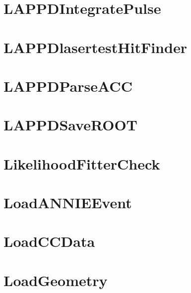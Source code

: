 \documentclass[twoside]{book}
\begin{document}
\chapter{L\-A\-P\-P\-D\-Integrate\-Pulse}
\label{md_UserTools_LAPPDIntegratePulse_README}
\hypertarget{md_UserTools_LAPPDIntegratePulse_README}{}

\chapter{L\-A\-P\-P\-Dlasertest\-Hit\-Finder}
\label{md_UserTools_LAPPDlasertestHitFinder_README}
\hypertarget{md_UserTools_LAPPDlasertestHitFinder_README}{}

\chapter{L\-A\-P\-P\-D\-Parse\-A\-C\-C}
\label{md_UserTools_LAPPDParseACC_README}
\hypertarget{md_UserTools_LAPPDParseACC_README}{}

\chapter{L\-A\-P\-P\-D\-Save\-R\-O\-O\-T}
\label{md_UserTools_LAPPDSaveROOT_README}
\hypertarget{md_UserTools_LAPPDSaveROOT_README}{}

\chapter{Likelihood\-Fitter\-Check}
\label{md_UserTools_LikelihoodFitterCheck_README}
\hypertarget{md_UserTools_LikelihoodFitterCheck_README}{}

\chapter{Load\-A\-N\-N\-I\-E\-Event}
\label{md_UserTools_LoadANNIEEvent_README}
\hypertarget{md_UserTools_LoadANNIEEvent_README}{}

\chapter{Load\-C\-C\-Data}
\label{md_UserTools_LoadCCData_README}
\hypertarget{md_UserTools_LoadCCData_README}{}

\chapter{Load\-Geometry}
\label{md_UserTools_LoadGeometry_README}
\hypertarget{md_UserTools_LoadGeometry_README}{}

\end{document}
